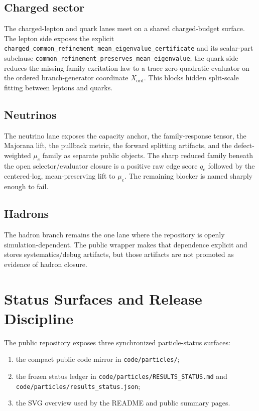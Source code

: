 \documentclass[11pt]{article}
\begin{document}
\subsection{Charged sector}

The charged-lepton and quark lanes meet on a shared charged-budget surface. The
lepton side exposes the explicit
\texttt{charged\_common\_refinement\_mean\_eigenvalue\_certificate} and its
scalar-part subclause
\texttt{common\_refinement\_preserves\_mean\_eigenvalue}; the quark side
reduces the missing family-excitation law to a trace-zero quadratic evaluator
on the ordered branch-generator coordinate \(X_{\mathrm{ord}}\). This blocks
hidden split-scale fitting between leptons and quarks.

\subsection{Neutrinos}

The neutrino lane exposes the capacity anchor, the family-response tensor, the
Majorana lift, the pullback metric, the forward splitting artifacts, and the
defect-weighted \(\mu_e\) family as separate public objects. The sharp reduced
family beneath the open selector/evaluator closure is a positive raw edge score
\(q_e\) followed by the centered-log, mean-preserving lift to \(\mu_e\). The
remaining blocker is named sharply enough to fail.

\subsection{Hadrons}

The hadron branch remains the one lane where the repository is openly
simulation-dependent. The public wrapper makes that dependence explicit and
stores systematics/debug artifacts, but those artifacts are not promoted as
evidence of hadron closure.

\section{Status Surfaces and Release Discipline}

The public repository exposes three synchronized particle-status surfaces:
\begin{enumerate}[leftmargin=2em]
\item the compact public code mirror in \texttt{code/particles/};
\item the frozen status ledger in
\texttt{code/particles/RESULTS\_STATUS.md} and
\texttt{code/particles/results\_status.json};
\item the SVG overview used by the README and public summary pages.
\end{enumerate}
\end{document}
